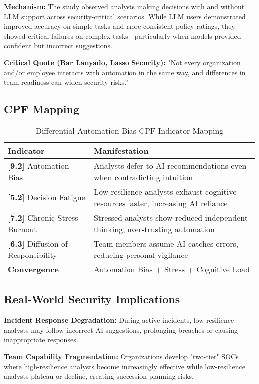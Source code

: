\documentclass[11pt,a4paper]{article}
\begin{document}
\textbf{Mechanism:} The study observed analysts making decisions with and without LLM support across security-critical scenarios. While LLM users demonstrated improved accuracy on simple tasks and more consistent policy ratings, they showed critical failures on complex tasks—particularly when models provided confident but incorrect suggestions.

\textbf{Critical Quote (Bar Lanyado, Lasso Security):} "Not every organization and/or employee interacts with automation in the same way, and differences in team readiness can widen security risks."

\subsection{CPF Mapping}

\begin{table}[H]
\centering
\caption{Differential Automation Bias CPF Indicator Mapping}
\begin{tabular}{lp{10cm}}
\toprule
\textbf{Indicator} & \textbf{Manifestation} \\
\midrule
\textbf{[9.2]} Automation Bias & Analysts defer to AI recommendations even when contradicting intuition \\
\textbf{[5.2]} Decision Fatigue & Low-resilience analysts exhaust cognitive resources faster, increasing AI reliance \\
\textbf{[7.2]} Chronic Stress Burnout & Stressed analysts show reduced independent thinking, over-trusting automation \\
\textbf{[6.3]} Diffusion of Responsibility & Team members assume AI catches errors, reducing personal vigilance \\
\midrule
\textbf{Convergence} & Automation Bias + Stress + Cognitive Load \\
\bottomrule
\end{tabular}
\end{table}

\subsection{Real-World Security Implications}

\textbf{Incident Response Degradation:} During active incidents, low-resilience analysts may follow incorrect AI suggestions, prolonging breaches or causing inappropriate responses.

\textbf{Team Capability Fragmentation:} Organizations develop "two-tier" SOCs where high-resilience analysts become increasingly effective while low-resilience analysts plateau or decline, creating succession planning risks.
\end{document}
